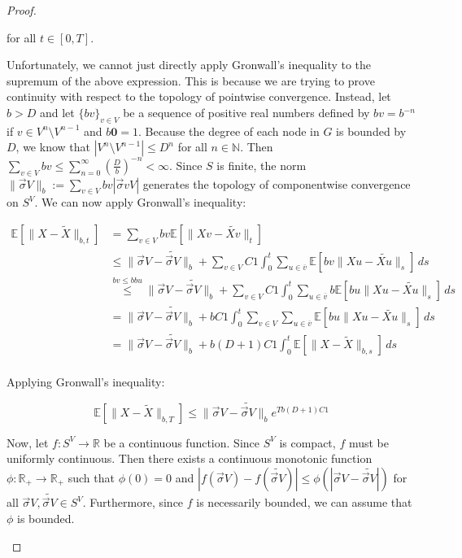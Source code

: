 \documentclass[12pt]{article}
\newcommand{\mb}{\mathbb}
\newcommand{\ra}{\rightarrow}
\newcommand{\ov}{\overline}
\newcommand{\os}{\overset}
\newcommand{\ind}{\hspace{24pt}}
\newcommand{\ex}[1]{\mb{E}\left[#1\right]}			%
\renewcommand{\root}{\mathbf{0}}				%
\renewcommand{\v}{v}							%
\newcommand{\vv}{u}								%
\renewcommand{\S}{S}							%
\newcommand{\s}{\sigma}							%
\newcommand{\sv}{\vec{\s}}						%
\renewcommand{\b}{b}							%
\newcommand{\T}{T}								%
\renewcommand{\t}{t}							%
\renewcommand{\tt}{s}							%
\newcommand{\X}{X}								%
\newcommand{\cl}{\ov}							%
\newcommand{\const}{C}							%
\newcommand{\degr}{D}							%
\newcommand{\sln}[1]{^{#1}}						%
\newcommand{\XState}[1]{\S^{#1}}				%
\newcommand{\alt}{\widetilde}						%
\begin{document}
\begin{proof}
\begin{enumerate}[(a)]
for all \(\t \in [0,\T]\).

\ind Unfortunately, we cannot just directly apply Gronwall's inequality to the supremum of the above expression. This is because we are trying to prove continuity with respect to the topology of pointwise convergence. Instead, let \(\b{} > \degr\) and let \(\{\b{\v}\}_{\v \in  V}\) be a sequence of positive real numbers defined by \(\b{\v} = \b{}^{-n}\) if \(\v \in  V\sln{n}\setminus  V\sln{n-1}\) and \(\b{\root} = 1\). Because the degree of each node in \(G\) is bounded by \(\degr\), we know that \(| V\sln{n}\setminus  V\sln{n-1}| \leq \degr^{n}\) for all \(n\in \mb{N}\). Then \(\sum_{\v \in  V} \b{\v} \leq \sum_{n=0}^\infty \left(\frac{\degr}{\b{}}\right)^{-n} < \infty\). Since \(\S\) is finite, the norm \(\|\sv{}{ V}\|_{\b{}} := \sum_{\v \in  V} \b{\v}|\sv{\v}{ V}|\) generates the topology of componentwise convergence on \(\S^ V\). We can now apply Gronwall's inequality:

\begin{align*}
\ex{\|\X{}{} - \alt{\X{}{}}\|_{\b{},\t}} &= \sum_{\v \in  V} \b{\v}\ex{\|\X{\v}{} - \alt{\X{\v}{}}\|_\t}\\
&\leq \|\sv{}{ V} - \alt{\sv{}{ V}}\|_{\b{}} + \sum_{\v \in  V}\const{1}\int_0^\t \sum_{\vv \in \cl{\v}} \ex{\b{\v}\|\X{\vv}{} - \alt{\X{\vv}{}}\|_\tt}\,d\tt\\
&\os{\b{\v}\leq \b{}\b{\vv}}{\leq} \|\sv{}{ V} - \alt{\sv{}{ V}}\|_{\b{}} + \sum_{\v \in  V}\const{1}\int_0^\t \sum_{\vv \in \cl{\v}} \b{}\ex{\b{\vv}\|\X{\vv}{} - \alt{\X{\vv}{}}\|_\tt}\,d\tt\\
&= \|\sv{}{ V} - \alt{\sv{}{ V}}\|_{\b{}} + \b{}\const{1}\int_0^\t \sum_{\v \in  V}\sum_{\vv \in \cl{\v}} \ex{\b{\vv}\|\X{\vv}{} - \alt{\X{\vv}{}}\|_\tt}\,d\tt\\
&=\|\sv{}{ V} - \alt{\sv{}{ V}}\|_{\b{}} + \b{}(\degr+1)\const{1}\int_0^\t \ex{\|\X{}{} - \alt{\X{}{}}\|_{\b{},\tt}}\,d\tt\\
\end{align*}

Applying Gronwall's inequality:

\[\ex{\|\X{}{} - \alt{\X{}{}}\|_{\b{},\T}} \leq \|\sv{}{ V} - \alt{\sv{}{ V}}\|_{\b{}}e^{\T\b{}(\degr+1)\const{1}}\]

Now, let \(f: \S^ V \ra \mb{R}\) be a continuous function. Since \(\S^ V\) is compact, \(f\) must be uniformly continuous. Then there exists a continuous monotonic function \(\phi: \mb{R}_+ \ra \mb{R}_+\) such that \(\phi(0) = 0\) and \(|f(\sv{}{ V}) - f(\alt{\sv{}{ V}})| \leq \phi(|\sv{}{ V} - \alt{\sv{}{ V}}|)\) for all \(\sv{}{ V},\alt{\sv{}{ V}}\in \S^ V\). Furthermore, since \(f\) is necessarily bounded, we can assume that \(\phi\) is bounded.


\end{enumerate}
\end{proof}
\end{document}
